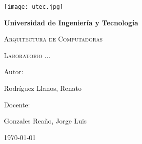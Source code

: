 
	\begin{titlepage}
		\centering
		
		
		{\texttt{[image: utec.jpg]}\par}
		\vspace{0.25cm}
		{\bfseries\LARGE Universidad de Ingeniería y Tecnología \par}
		{\scshape\Large Arquitectura de Computadoras \par}
		\vspace{0.5cm}
		{\scshape\Huge Laboratorio ...\par}
		{\itshape\Large  \par}
		\vfill
		{\Large Autor: \par}
		{\Large Rodríguez Llanos, Renato \\ \par}
		\vfill
		\vspace{0.25cm}
		{\Large Docente: \par}
		{\Large Gonzales Reaño, Jorge Luis\\ \par}
		\vspace{0.5cm}
		
		{\Large \today \par}
	\end{titlepage}
